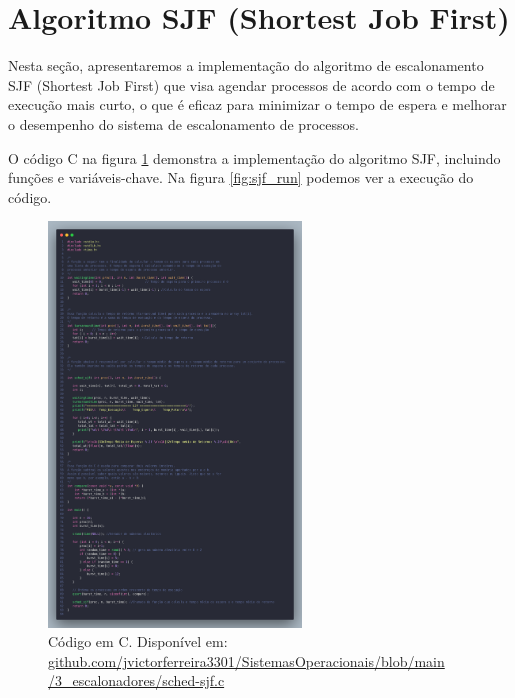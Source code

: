 \documentclass[
	12pt,				%
	openright,			%
	oneside,			%
	a4paper,			%
	chapter=TITLE,		%
	english,			%
	french,				%
	spanish,			%
	brazil				%
	]{abntex2}
\theoremstyle{definition}
\begin{document}
\section{Algoritmo SJF (Shortest Job First)}
Nesta seção, apresentaremos a implementação do algoritmo de escalonamento SJF (Shortest Job First) que visa agendar processos de acordo 
com o tempo de execução mais curto, o que é eficaz para minimizar o tempo de espera e melhorar o desempenho do sistema de escalonamento 
de processos. 

O código C na figura \ref{fig:sjf} demonstra a implementação do algoritmo SJF, incluindo funções e variáveis-chave. Na figura
\ref{fig:sjf_run} podemos ver a execução do código.

\begin{figure}[H]
    \centering
    \includegraphics[width=0.6\textwidth]{imagens/sjf_src.png}
    \caption{Código em C. Disponível em: \href{https://github.com/jvictorferreira3301/Sistemas_Operacionais/blob/main/3_escalonadores/sched-sjf.c}{github.com/jvictorferreira3301/SistemasOperacionais/blob/main
    /3\_escalonadores/sched-sjf.c}}
    \label{fig:sjf}
\end{figure}
\end{document}
